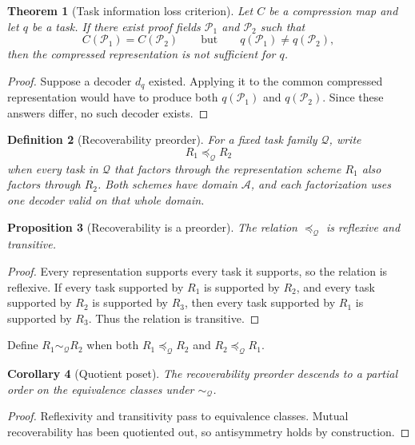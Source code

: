 \documentclass[11pt,oneside]{article}
\theoremstyle{komorebiplain}
\newtheorem{theorem}{Theorem}[section]
\newtheorem{proposition}[theorem]{Proposition}
\newtheorem{corollary}[theorem]{Corollary}
\theoremstyle{komorebidefinition}
\newtheorem{definition}[theorem]{Definition}
\theoremstyle{komorebiremark}
\newcommand{\Pcal}{\mathcal P}
\newcommand{\Qcal}{\mathcal Q}
\begin{document}
\begin{theorem}[Task information loss criterion]
\label{res:7:3}
Let $C$ be a compression map and let $q$ be a task. If there exist proof fields $\Pcal_1$ and $\Pcal_2$ such that
\[
C(\Pcal_1)=C(\Pcal_2)
\qquad\text{but}\qquad
q(\Pcal_1)\ne q(\Pcal_2),
\]
then the compressed representation is not sufficient for $q$.
\end{theorem}

\begin{proof}
Suppose a decoder $d_q$ existed. Applying it to the common compressed representation would have to produce both $q(\Pcal_1)$ and $q(\Pcal_2)$. Since these answers differ, no such decoder exists.
\end{proof}

\begin{definition}[Recoverability preorder]
\label{res:7:4}
For a fixed task family $\Qcal$, write
\[
R_1\preceq_{\Qcal} R_2
\]
when every task in $\Qcal$ that factors through the representation scheme $R_1$ also factors through $R_2$. Both schemes have domain $\mathscr A$, and each factorization uses one decoder valid on that whole domain.
\end{definition}

\begin{proposition}[Recoverability is a preorder]
\label{res:7:5}
The relation $\preceq_{\Qcal}$ is reflexive and transitive.
\end{proposition}

\begin{proof}
Every representation supports every task it supports, so the relation is reflexive. If every task supported by $R_1$ is supported by $R_2$, and every task supported by $R_2$ is supported by $R_3$, then every task supported by $R_1$ is supported by $R_3$. Thus the relation is transitive.
\end{proof}

Define $R_1\sim_{\Qcal}R_2$ when both $R_1\preceq_{\Qcal}R_2$ and $R_2\preceq_{\Qcal}R_1$.

\begin{corollary}[Quotient poset]
\label{res:7:6}
The recoverability preorder descends to a partial order on the equivalence classes under $\sim_{\Qcal}$.
\end{corollary}

\begin{proof}
Reflexivity and transitivity pass to equivalence classes. Mutual recoverability has been quotiented out, so antisymmetry holds by construction.
\end{proof}
\end{document}
